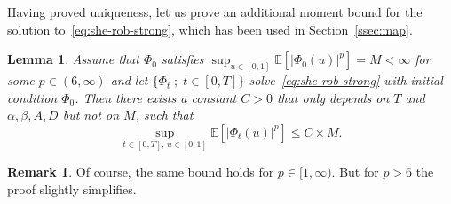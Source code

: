 \documentclass[10pt]{amsart}
\newtheorem{lemm}[theo]{Lemma}\newtheorem{prop}[theo]{Proposition}\newtheorem{coro}[theo]{Corollary}\newtheorem{conj}[theo]{Conjecture}
\theoremstyle{definition}\newtheorem{defi}[theo]{Definition}\newtheorem{rema}[theo]{Remark}\newtheorem{exam}[theo]{Example}\newtheorem{exem}[theo]{Example}\newtheorem{nota}[theo]{Notation}
\newcommand{\bb}[1]{{\mathbb #1}}
\renewcommand{\le}{\leqslant}
\begin{document}
Having proved uniqueness, let us prove an additional moment bound for the solution to~\eqref{eq:she-rob-strong}, which has been used in Section~\ref{ssec:map}.

\goodbreak
\begin{lemm}\label{lem:she-moment}
Assume that $\Phi_0$ satisfies $\sup_{u \in [0,1]} \bb E[|\Phi_0(u)|^p] = M <\infty$ for some $p \in (6,\infty)$ and let $\{\Phi_t \; ; \; t \in [0,T]\}$ solve~\eqref{eq:she-rob-strong} with initial condition $\Phi_0$. Then there exists a constant $C>0$ that only depends on $T$ and $\alpha,\beta,A,D$ but not on $M$, such that
\[
\sup_{t\in [0,T],\, u \in [0,1]} \bb E[|\Phi_t(u)|^p] \le C\times M.
\]
\end{lemm}

\begin{rema}
Of course, the same bound holds for $p \in [1,\infty)$. But for $p>6$ the proof slightly simplifies.
\end{rema}
\end{document}
